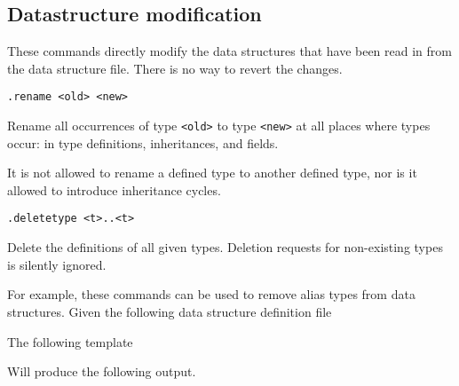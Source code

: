 \subsection{Datastructure modification}
These commands directly modify the data structures that have been
read in from the data structure file. There is no way to revert the
changes.
\begin{verbatim}
.rename <old> <new>
\end{verbatim}
\begin{desc}
Rename all occurrences of type \verb'<old>' to type \verb'<new>' at
all places where types occur: in type definitions, inheritances,
and fields.

It is not allowed to rename a defined type to another defined type,
nor is it allowed to introduce inheritance cycles.
\end{desc}
\begin{verbatim}
.deletetype <t>..<t>
\end{verbatim}
\begin{desc}
Delete the definitions of all given types. Deletion requests for
non-existing types is silently ignored.
\end{desc}
For example, these commands can be used to remove alias types from
data structures. Given the following data structure definition file
\begin{showfile}

\end{showfile}
The following template
\begin{showfile}

\end{showfile}
Will produce the following output.
\begin{showfile}

\end{showfile}
